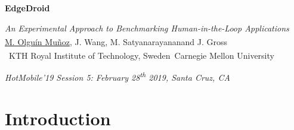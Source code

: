 \documentclass[aspectratio=1610]{beamer}
\newcommand{\kthaffil}{\textsuperscript{\textdagger}}
\newcommand{\cmuaffil}{\textsuperscript{\textdaggerdbl}}
\begin{document}
\startpage
\begin{frame}{}
    \begin{center}
        \begin{LARGE}
            \textbf{EdgeDroid}\\
        \end{LARGE}
        \emph{An Experimental Approach to Benchmarking Human-in-the-Loop Applications}\\
        \vspace{0.02\textheight}
        {\footnotesize \underline{M. Olguín Muñoz}\kthaffil, J. Wang\cmuaffil, M. Satyanarayanan\cmuaffil and J. Gross\kthaffil\\
            \vspace{0.02\textheight}
            \kthaffil~KTH Royal Institute of Technology, Sweden\hspace{.1\linewidth}\cmuaffil~Carnegie Mellon University\\}
    \end{center}

    \vspace{0.04\textheight}

    \begin{tiny}
        \raggedleft%
        \emph{HotMobile'19 Session 5: February 28\textsuperscript{th} 2019, Santa Cruz, CA}\\
    \end{tiny}
\end{frame}

\normalpage%
{
    \AtBeginSection[]{}
    \section{Introduction}
}

\begin{frame}{}
    \begin{center}
        \\
    \end{center}
\end{frame}
\end{document}
